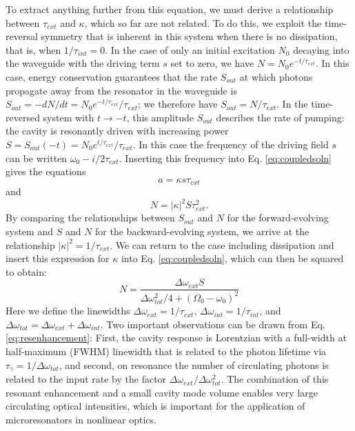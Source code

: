  To extract anything further from this equation, we must derive a relationship between $\tau_{ext}$ and $\kappa$, which so far are not related. To do this, we exploit the time-reversal symmetry that is inherent in this system when there is no dissipation, that is, when $1/\tau_{int}=0$. In the case of only an initial excitation $N_0$ decaying into the waveguide with the driving term $s$ set to zero, we have $N=N_0e^{-t/\tau_{ext}}$. In this case, energy conservation guarantees that the rate $S_{out}$ at which photons propagate away from the resonator in the waveguide is $S_{out}=-dN/dt=N_0e^{-t/\tau_{ext}}/\tau_{ext}$; we therefore have $S_{out}=N/\tau_{ext}$. In the time-reversed system with $t\rightarrow-t$, this amplitude $S_{out}$ describes the rate of pumping: the cavity is resonantly driven with increasing power $S=S_{out}(-t)=N_0e^{t/\tau_{ext}}/\tau_{ext}$. In this case the frequency of the driving field $s$ can be written $\omega_0-i/2\tau_{ext}$. Inserting this frequency into Eq. \ref{eq:coupledsoln} gives the equations
 \begin{equation}
  a=\kappa s \tau_{ext}
  \end{equation}
  and
  \begin{equation}
   N=|\kappa|^2 S \tau_{ext}^2.
   \end{equation}
   By comparing the relationships between $S_{out}$ and $N$ for the forward-evolving system and $S$ and $N$ for the backward-evolving system, we arrive at the relationship $|\kappa|^2=1/\tau_{ext}$. We can return to the case including dissipation and insert this expression for $\kappa$ into Eq. \ref{eq:coupledsoln}, which can then be squared to obtain:
   \begin{equation}
   N=\frac{\Delta\omega_{ext}S}{\Delta\omega_{tot}^2/4+(\Omega_0-\omega_0)^2} \label{eq:resenhancement}
   \end{equation}
   Here we define the linewidths $\Delta\omega_{ext}=1/\tau_{ext}$, $\Delta\omega_{int}=1/\tau_{int}$, and $\Delta\omega_{tot}=\Delta\omega_{ext}+\Delta\omega_{int}$. Two important observations can be drawn from Eq. \ref{eq:resenhancement}: First, the cavity response is Lorentzian with a full-width at half-maximum (FWHM) linewidth that is related to the photon lifetime via $\tau_\gamma=1/\Delta\omega_{tot}$, and second, on resonance the number of circulating photons is related to the input rate by the factor $\Delta\omega_{ext}/\Delta\omega_{tot}^2$. The combination of this resonant enhancement and a small cavity mode volume enables very large circulating optical intensities, which is important for the application of microresonators in nonlinear optics.
   
